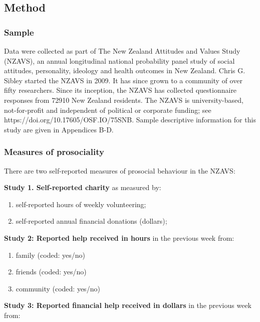 \documentclass[
  single column]{article}
\providecommand{\tightlist}{%
  \setlength{\itemsep}{0pt}\setlength{\parskip}{0pt}}\usepackage{longtable,booktabs,array}
\begin{document}
\subsection{Method}\label{method}

\subsubsection{Sample}\label{sample}

Data were collected as part of The New Zealand Attitudes and Values
Study (NZAVS), an annual longitudinal national probability panel study
of social attitudes, personality, ideology and health outcomes in New
Zealand. Chris G. Sibley started the NZAVS in 2009. It has since grown
to a community of over fifty researchers. Since its inception, the NZAVS
has collected questionnaire responses from 72910 New Zealand residents.
The NZAVS is university-based, not-for-profit and independent of
political or corporate funding; see
https://doi.org/10.17605/OSF.IO/75SNB. Sample descriptive information
for this study are given in Appendices B-D.

\subsubsection{Measures of prosociality}\label{measures-of-prosociality}

There are two self-reported measures of prosocial behaviour in the
NZAVS:

\textbf{Study 1. Self-reported charity} as measured by:

\begin{enumerate}
\def\labelenumi{(\alph{enumi})}
\tightlist
\item
  self-reported hours of weekly volunteering;
\item
  self-reported annual financial donations (dollars);
\end{enumerate}

\textbf{Study 2: Reported help received in hours} in the previous week
from:

\begin{enumerate}
\def\labelenumi{(\alph{enumi})}
\tightlist
\item
  family (coded: yes/no)
\item
  friends (coded: yes/no)
\item
  community (coded: yes/no)
\end{enumerate}

\textbf{Study 3: Reported financial help received in dollars} in the
previous week from:
\end{document}
